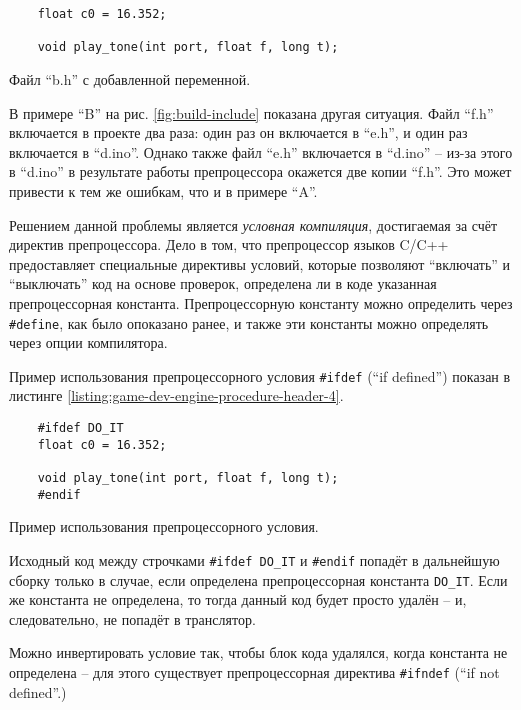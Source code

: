 \documentclass[../sparc.tex]{subfiles}
\begin{document}
\begin{listing}[H]
  \begin{verbatim}
    float c0 = 16.352;

    void play_tone(int port, float f, long t);
  \end{verbatim}
  \label{listing:game-dev-engine-procedure-header-3}
  \caption{Файл ``b.h'' с добавленной переменной.}
\end{listing}

В примере ``B'' на рис. \ref{fig:build-include} показана другая ситуация.  Файл
``f.h'' включается в проекте два раза: один раз он включается в ``e.h'', и один
раз включается в ``d.ino''.  Однако также файл ``e.h'' включается в ``d.ino'' --
из-за этого в ``d.ino'' в результате работы препроцессора окажется две копии
``f.h''.  Это может привести к тем же ошибкам, что и в примере ``A''.

Решением данной проблемы является \emph{условная компиляция}, достигаемая за
счёт директив препроцессора.  Дело в том, что препроцессор языков C/C++
предоставляет специальные директивы условий, которые позволяют ``включать'' и
``выключать'' код на основе проверок, определена ли в коде указанная
препроцессорная константа.  Препроцессорную константу можно определить через
\texttt{#define}, как было опоказано ранее, и также эти константы можно
определять через опции компилятора.

Пример использования препроцессорного условия \texttt{#ifdef} (``if
defined'') показан в листинге \ref{listing:game-dev-engine-procedure-header-4}.

\begin{listing}[H]
  \begin{verbatim}
    #ifdef DO_IT
    float c0 = 16.352;

    void play_tone(int port, float f, long t);
    #endif
  \end{verbatim}
  \label{listing:game-dev-engine-procedure-header-4}
  \caption{Пример использования препроцессорного условия.}
\end{listing}

Исходный код между строчками \texttt{#ifdef DO_IT} и
\texttt{#endif} попадёт в дальнейшую сборку только в случае, если
определена препроцессорная константа \texttt{DO_IT}.  Если же константа
не определена, то тогда данный код будет просто удалён -- и, следовательно, не
попадёт в транслятор.

Можно инвертировать условие так, чтобы блок кода удалялся, когда константа не
определена -- для этого существует препроцессорная директива
\texttt{#ifndef} (``if not defined''.)
\end{document}
